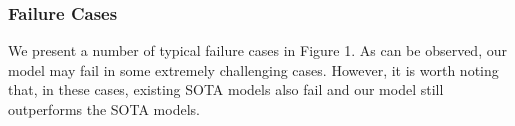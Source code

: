 \documentclass[lettersize,journal]{IEEEtran}
\newcommand{\figref}[1]{Figure 1}%
\newcommand{\figref}[1]{Fig.~\ref{#1}}%
\begin{document}
\subsubsection{Failure Cases}
We present a number of typical failure cases in \figref{fig:failure}.
As can be observed, our model may fail in some extremely challenging cases. However, it is worth noting that, in these cases, existing SOTA models also fail and our model still outperforms the SOTA models.
\begin{table*}[ht]
	\caption{Quantitative evaluation for Polyp segmentation on the four datasets. The best results are highlighted in \textbf{Bold} fonts.} \vspace{-0.25cm}
\end{table*}
\end{document}
